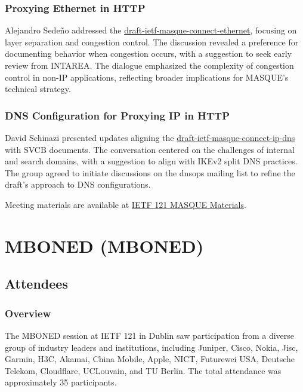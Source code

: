 \documentclass{article}
\begin{document}
\subsubsection{Proxying Ethernet in HTTP}
Alejandro Sedeño addressed the \href{https://datatracker.ietf.org/doc/draft-ietf-masque-connect-ethernet/}{draft-ietf-masque-connect-ethernet}, focusing on layer separation and congestion control. The discussion revealed a preference for documenting behavior when congestion occurs, with a suggestion to seek early review from INTAREA. The dialogue emphasized the complexity of congestion control in non-IP applications, reflecting broader implications for MASQUE's technical strategy.

\subsubsection{DNS Configuration for Proxying IP in HTTP}
David Schinazi presented updates aligning the \href{https://datatracker.ietf.org/doc/draft-ietf-masque-connect-ip-dns/}{draft-ietf-masque-connect-ip-dns} with SVCB documents. The conversation centered on the challenges of internal and search domains, with a suggestion to align with IKEv2 split DNS practices. The group agreed to initiate discussions on the dnsops mailing list to refine the draft's approach to DNS configurations.

Meeting materials are available at \href{https://datatracker.ietf.org/meeting/121/materials/masque}{IETF 121 MASQUE Materials}.



\newpage

\section{MBONED (MBONED)}

\subsection{Attendees}
\subsubsection{Overview}
The MBONED session at IETF 121 in Dublin saw participation from a diverse group of industry leaders and institutions, including Juniper, Cisco, Nokia, Jisc, Garmin, H3C, Akamai, China Mobile, Apple, NICT, Futurewei USA, Deutsche Telekom, Cloudflare, UCLouvain, and TU Berlin. The total attendance was approximately 35 participants.
\end{document}

